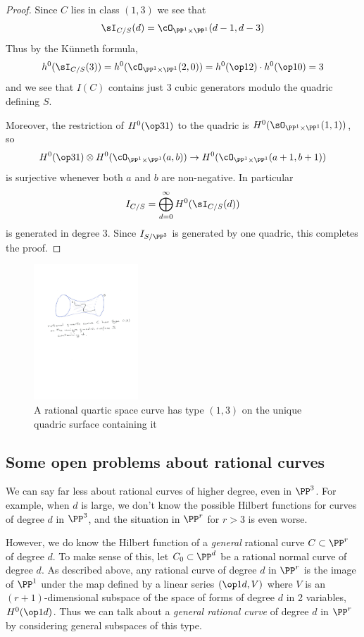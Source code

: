 \begin{proof}
Since $C$ lies in class $(1,3)$ we see that 
$$
\sI_{C/S}(d) = \cO_{\PP^1\times \PP^1}(d-1, d-3)
%
$$
Thus by the K\"unneth formula,
$$
h^0(\sI_{C/S}(3)) = h^0(\cO_{\PP^1\times \PP^1}(2, 0)) = h^0(\op12)\cdot h^0(\op10) = 3
$$
and we see that $I(C)$ contains just 3 cubic generators modulo the quadric defining $S$. 

Moreover, the restriction
of $H^0(\op31)$ to the quadric is $H^0(\sO_{\PP^1\times \PP^1}(1,1))$,
so 
$$
H^0(\op31) \otimes H^0(\cO_{\PP^1\times \PP^1}(a, b)) \to 
H^0(\cO_{\PP^1\times \PP^1}(a+1, b+1))
$$
is surjective whenever both $a$ and $b$ are non-negative. In particular
$$
I_{C/S} = \bigoplus_{d=0}^\infty H^0(\sI_{C/S}(d))
$$
 is generated in degree 3. Since $I_{S/\PP^3}$ is generated by one quadric, this
  completes the proof.
\end{proof}

\begin{figure}
 \caption{A rational quartic space curve has type $(1,3)$ on the unique quadric surface containing it}
\centerline {\includegraphics[height=2in]{"Fig3.2.pdf"}}
\end{figure}


\subsection{Some open problems about rational curves}

We can say far less about rational curves of higher degree, even in $\PP^3$. For example, when $d$ is large, we
don't know the possible Hilbert functions for curves of degree $d$ in $\PP^3$, and the situation in $\PP^r$ for
$r>3$ is even worse.

However, we do know the Hilbert function of a \emph{general} rational curve $C \subset \PP^r$ of degree $d$. To make sense of this, let $C_0 \subset \PP^d$ be a rational normal curve of degree $d$. 
As described above, any rational curve of degree $d$ in $\PP^r$ is the image of $\PP^1$ under the map defined by
a linear series $(\op1d, V)$ where $V$ is an $(r+1)$-dimensional subspace of the space of
forms of degree $d$ in 2 variables, $H^0(\op1d)$. Thus we can talk about a \emph{general rational curve} of degree $d$ in $\PP^r$ by considering general subspaces of this type.

